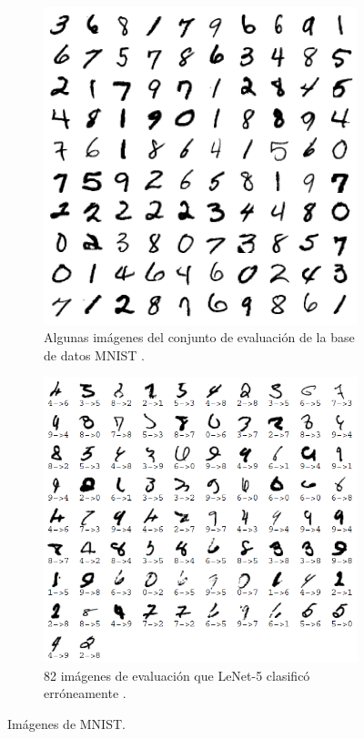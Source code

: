 \begin{figure}[h!]
    \centering
    \begin{subfigure}[b]{0.4\textwidth}
        \centering
        \includegraphics[width=\textwidth]{images/mnist/MNIST.png}
        \caption{Algunas imágenes del conjunto de evaluación de la base de datos MNIST \cite{Lecun98}.}
        \label{mnist1}
    \end{subfigure}
    \hspace{1cm}
    \begin{subfigure}[b]{0.45\textwidth}
        \centering
        \includegraphics[width=\textwidth]{images/mnist/MNISTmiscl.png}
        \caption{82 imágenes de evaluación que LeNet-5 clasificó erróneamente \cite{Lecun98}.}
        \label{mnist2}
    \end{subfigure}
    \caption{Imágenes de MNIST.}
    \label{mnist}
\end{figure}

